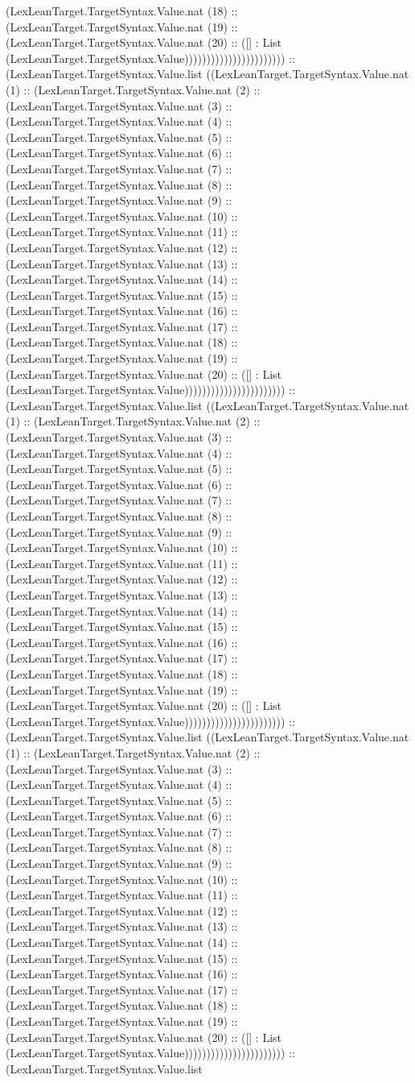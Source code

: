 \documentclass[11pt]{article}
\begin{document}
(LexLeanTarget.TargetSyntax.Value.nat (18) :: (LexLeanTarget.TargetSyntax.Value.nat (19) :: (LexLeanTarget.TargetSyntax.Value.nat (20) :: ([] : List (LexLeanTarget.TargetSyntax.Value))))))))))))))))))))))) :: (LexLeanTarget.TargetSyntax.Value.list ((LexLeanTarget.TargetSyntax.Value.nat (1) :: (LexLeanTarget.TargetSyntax.Value.nat (2) :: (LexLeanTarget.TargetSyntax.Value.nat (3) :: (LexLeanTarget.TargetSyntax.Value.nat (4) :: (LexLeanTarget.TargetSyntax.Value.nat (5) :: (LexLeanTarget.TargetSyntax.Value.nat (6) :: (LexLeanTarget.TargetSyntax.Value.nat (7) :: (LexLeanTarget.TargetSyntax.Value.nat (8) :: (LexLeanTarget.TargetSyntax.Value.nat (9) :: (LexLeanTarget.TargetSyntax.Value.nat (10) :: (LexLeanTarget.TargetSyntax.Value.nat (11) :: (LexLeanTarget.TargetSyntax.Value.nat (12) :: (LexLeanTarget.TargetSyntax.Value.nat (13) :: (LexLeanTarget.TargetSyntax.Value.nat (14) :: (LexLeanTarget.TargetSyntax.Value.nat (15) :: (LexLeanTarget.TargetSyntax.Value.nat (16) :: (LexLeanTarget.TargetSyntax.Value.nat (17) :: (LexLeanTarget.TargetSyntax.Value.nat (18) :: (LexLeanTarget.TargetSyntax.Value.nat (19) :: (LexLeanTarget.TargetSyntax.Value.nat (20) :: ([] : List (LexLeanTarget.TargetSyntax.Value))))))))))))))))))))))) :: (LexLeanTarget.TargetSyntax.Value.list ((LexLeanTarget.TargetSyntax.Value.nat (1) :: (LexLeanTarget.TargetSyntax.Value.nat (2) :: (LexLeanTarget.TargetSyntax.Value.nat (3) :: (LexLeanTarget.TargetSyntax.Value.nat (4) :: (LexLeanTarget.TargetSyntax.Value.nat (5) :: (LexLeanTarget.TargetSyntax.Value.nat (6) :: (LexLeanTarget.TargetSyntax.Value.nat (7) :: (LexLeanTarget.TargetSyntax.Value.nat (8) :: (LexLeanTarget.TargetSyntax.Value.nat (9) :: (LexLeanTarget.TargetSyntax.Value.nat (10) :: (LexLeanTarget.TargetSyntax.Value.nat (11) :: (LexLeanTarget.TargetSyntax.Value.nat (12) :: (LexLeanTarget.TargetSyntax.Value.nat (13) :: (LexLeanTarget.TargetSyntax.Value.nat (14) :: (LexLeanTarget.TargetSyntax.Value.nat (15) :: (LexLeanTarget.TargetSyntax.Value.nat (16) :: (LexLeanTarget.TargetSyntax.Value.nat (17) :: (LexLeanTarget.TargetSyntax.Value.nat (18) :: (LexLeanTarget.TargetSyntax.Value.nat (19) :: (LexLeanTarget.TargetSyntax.Value.nat (20) :: ([] : List (LexLeanTarget.TargetSyntax.Value))))))))))))))))))))))) :: (LexLeanTarget.TargetSyntax.Value.list ((LexLeanTarget.TargetSyntax.Value.nat (1) :: (LexLeanTarget.TargetSyntax.Value.nat (2) :: (LexLeanTarget.TargetSyntax.Value.nat (3) :: (LexLeanTarget.TargetSyntax.Value.nat (4) :: (LexLeanTarget.TargetSyntax.Value.nat (5) :: (LexLeanTarget.TargetSyntax.Value.nat (6) :: (LexLeanTarget.TargetSyntax.Value.nat (7) :: (LexLeanTarget.TargetSyntax.Value.nat (8) :: (LexLeanTarget.TargetSyntax.Value.nat (9) :: (LexLeanTarget.TargetSyntax.Value.nat (10) :: (LexLeanTarget.TargetSyntax.Value.nat (11) :: (LexLeanTarget.TargetSyntax.Value.nat (12) :: (LexLeanTarget.TargetSyntax.Value.nat (13) :: (LexLeanTarget.TargetSyntax.Value.nat (14) :: (LexLeanTarget.TargetSyntax.Value.nat (15) :: (LexLeanTarget.TargetSyntax.Value.nat (16) :: (LexLeanTarget.TargetSyntax.Value.nat (17) :: (LexLeanTarget.TargetSyntax.Value.nat (18) :: (LexLeanTarget.TargetSyntax.Value.nat (19) :: (LexLeanTarget.TargetSyntax.Value.nat (20) :: ([] : List (LexLeanTarget.TargetSyntax.Value))))))))))))))))))))))) :: (LexLeanTarget.TargetSyntax.Value.list 
\end{document}
